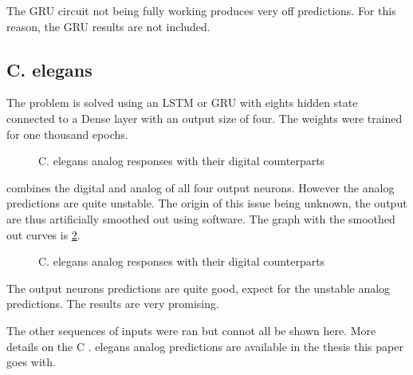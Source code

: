 The GRU circuit not being fully working produces very off predictions. For this reason, the GRU results are not included.

\subsection{C. elegans}

The problem is solved using an LSTM or GRU with eights hidden state connected to a Dense layer with an output size of four. The weights were trained for one thousand epochs.

\begin{figure}[b]
  \centering
  
  \caption{\acs{C. elegans} analog responses with their digital counterparts}
  \label{graph:celegansAnalog0}
\end{figure}

 combines the digital and analog of all four output neurons. However the analog predictions are quite unstable. The origin of this issue being unknown, the output are thus artificially smoothed out using software. The graph with the smoothed out curves is \cref{graph:celegansAnalog1}.

\begin{figure}[t]
  \centering
  
  \caption{\acs{C. elegans} analog responses with their digital counterparts}
  \label{graph:celegansAnalog1}
\end{figure}

The output neurons predictions are quite good, expect for the unstable analog predictions. The results are very promising.

The other sequences of inputs were ran but connot all be shown here. More details on the C . elegans analog predictions are available in the thesis this paper goes with.
